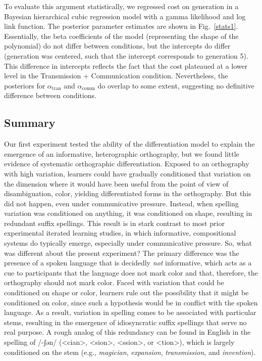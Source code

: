 \documentclass[doc,biblatex]{apa7}
\begin{document}
To evaluate this argument statistically, we regressed cost on generation in a Bayesian hierarchical cubic regression model with a gamma likelihood and log link function. The posterior parameter estimates are shown in Fig.~\ref{stats1}. Essentially, the beta coefficients of the model (representing the shape of the polynomial) do not differ between conditions, but the intercepts do differ (generation was centered, such that the intercept corresponds to generation 5). This difference in intercepts reflects the fact that the cost plateaued at a lower level in the Transmission + Communication condition. Nevertheless, the posteriors for $\alpha_\mathrm{tran}$ and $\alpha_\mathrm{comm}$ do overlap to some extent, suggesting no definitive difference between conditions.

\subsection{Summary}

Our first experiment tested the ability of the differentiation model to explain the emergence of an informative, heterographic orthography, but we found little evidence of systematic orthographic differentiation. Exposed to an orthography with high variation, learners could have gradually conditioned that variation on the dimension where it would have been useful from the point of view of disambiguation, color, yielding differentiated forms in the orthography. But this did not happen, even under communicative pressure. Instead, when spelling variation was conditioned on anything, it was conditioned on shape, resulting in redundant suffix spellings. This result is in stark contrast to most prior experimental iterated learning studies, in which informative, compositional systems do typically emerge, especially under communicative pressure. So, what was different about the present experiment? The primary difference was the presence of a spoken language that is decidedly \textit{not} informative, which acts as a cue to participants that the language does not mark color and that, therefore, the orthography should not mark color. Faced with variation that could be conditioned on shape or color, learners rule out the possibility that it might be conditioned on color, since such a hypothesis would be in conflict with the spoken language. As a result, variation in spelling comes to be associated with particular stems, resulting in the emergence of idiosyncratic suffix spellings that serve no real purpose. A rough analog of this redundancy can be found in English in the spelling of /-ʃən/ (<cian>, <sion>, <ssion>, or <tion>), which is largely conditioned on the stem (e.g., \textit{magician}, \textit{expansion}, \textit{transmission}, and \textit{invention}).
\end{document}
